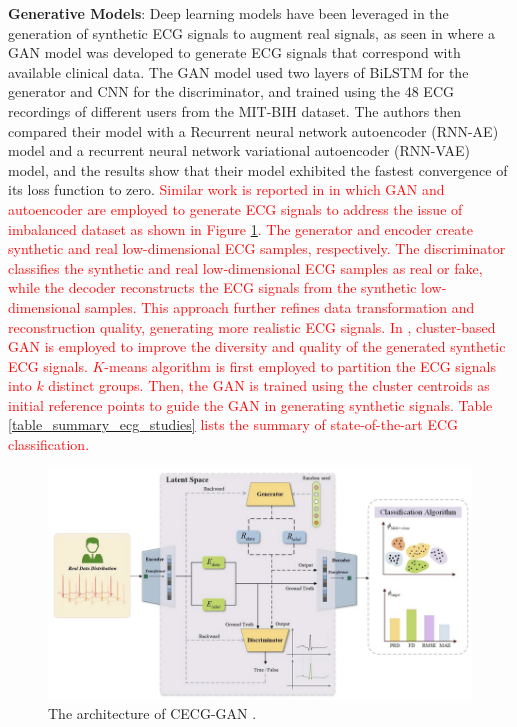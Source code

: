 \documentclass[preprint,12pt]{elsarticle}
\begin{document}
\textbf{Generative Models}: Deep learning models have been leveraged in the generation of synthetic ECG signals to augment real signals, as seen in \citep{zhu_electrocardiogram_2019} where a GAN model was developed to generate ECG signals that correspond with available clinical data. The GAN model used two layers of BiLSTM  for the generator and CNN for the discriminator, and trained using the 48 ECG recordings of different users from the MIT-BIH dataset. The authors then compared their model with a Recurrent neural network autoencoder (RNN-AE) model and a recurrent neural network variational autoencoder (RNN-VAE) model, and the results show that their model exhibited the fastest convergence of its loss function to zero. \textcolor{red}{Similar work is reported in \citep{yang_data_2024} in which GAN and autoencoder are employed to generate ECG signals to address the issue of imbalanced dataset as shown in Figure \ref{fig_ecg_gan_ae}. The generator and encoder create synthetic and real low-dimensional ECG samples, respectively. The discriminator classifies the synthetic and real low-dimensional ECG samples as real or fake, while the decoder reconstructs the ECG signals from the synthetic low-dimensional samples. This approach further refines data transformation and reconstruction quality, generating more realistic ECG signals. In \citep{msigwa_iot-driven_2024}, cluster-based GAN is employed to improve the diversity and quality of the generated synthetic ECG signals. $K$-means algorithm is first employed to partition the ECG signals into $k$ distinct groups. Then, the GAN is trained using the cluster centroids as initial reference points to guide the GAN in generating synthetic signals. Table \ref{table_summary_ecg_studies} lists the summary of state-of-the-art ECG classification.}

\begin{figure}[h!]
    \centering
    \includegraphics[scale=0.4]{fig_ecg_gan_ae.png}
    \caption{The architecture of CECG-GAN \citep{yang_data_2024}.}
    \label{fig_ecg_gan_ae}
\end{figure}
\end{document}
